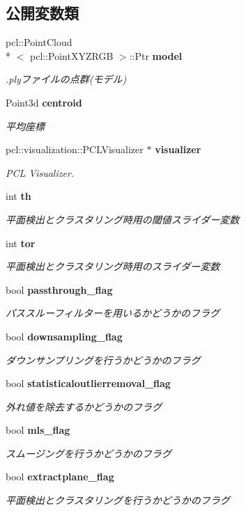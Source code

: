 \subsection*{公開変数類}
\begin{DoxyCompactItemize}
\item 
pcl\-::\-Point\-Cloud\\*
$<$ pcl\-::\-Point\-X\-Y\-Z\-R\-G\-B $>$\-::Ptr {\bf model}
\begin{DoxyCompactList}\small\item\em .plyファイルの点群(モデル) \end{DoxyCompactList}\item 
Point3d {\bf centroid}
\begin{DoxyCompactList}\small\item\em 平均座標 \end{DoxyCompactList}\item 
pcl\-::visualization\-::\-P\-C\-L\-Visualizer $\ast$ {\bf visualizer}
\begin{DoxyCompactList}\small\item\em P\-C\-L Visualizer. \end{DoxyCompactList}\item 
int {\bf th}
\begin{DoxyCompactList}\small\item\em 平面検出とクラスタリング時用の閾値スライダー変数 \end{DoxyCompactList}\item 
int {\bf tor}
\begin{DoxyCompactList}\small\item\em 平面検出とクラスタリング時用のスライダー変数 \end{DoxyCompactList}\item 
bool {\bf passthrough\-\_\-flag}
\begin{DoxyCompactList}\small\item\em パススルーフィルターを用いるかどうかのフラグ \end{DoxyCompactList}\item 
bool {\bf downsampling\-\_\-flag}
\begin{DoxyCompactList}\small\item\em ダウンサンプリングを行うかどうかのフラグ \end{DoxyCompactList}\item 
bool {\bf statisticaloutlierremoval\-\_\-flag}
\begin{DoxyCompactList}\small\item\em 外れ値を除去するかどうかのフラグ \end{DoxyCompactList}\item 
bool {\bf mls\-\_\-flag}
\begin{DoxyCompactList}\small\item\em スムージングを行うかどうかのフラグ \end{DoxyCompactList}\item 
bool {\bf extractplane\-\_\-flag}
\begin{DoxyCompactList}\small\item\em 平面検出とクラスタリングを行うかどうかのフラグ \end{DoxyCompactList}\end{DoxyCompactItemize}


